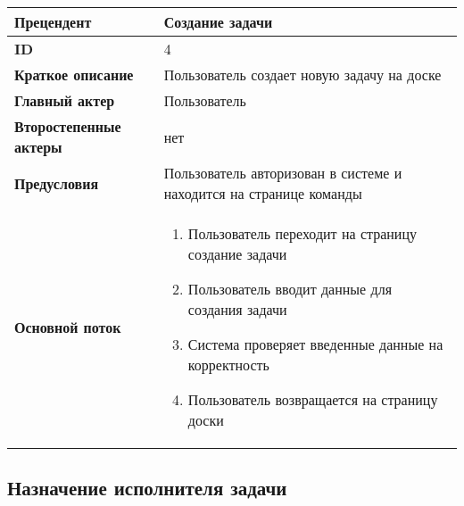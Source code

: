 \documentclass[14pt,a4paper]{extarticle}
\begin{document}
\begin{tabular}{|l|p{9cm}|}
	\hline
	\textbf{Прецендент}            & Создание задачи                                                    \\
	\hline
	\textbf{ID}                    & 4                                                                  \\
	\hline
	\textbf{Краткое описание}      & Пользователь создает новую задачу на доске                         \\
	\hline
	\textbf{Главный актер}         & Пользователь                                                       \\
	\hline
	\textbf{Второстепенные актеры} & нет                                                                \\
	\hline
	\textbf{Предусловия}           & Пользователь авторизован в системе и находится на странице команды \\
	\hline
	\textbf{Основной поток}        & \begin{enumerate}
		                                 \item Пользователь переходит на страницу создание задачи
		                                 \item Пользователь вводит данные для создания задачи
		                                 \item Система проверяет введенные данные на корректность
		                                 \item Пользователь возвращается на страницу доски
	                                 \end{enumerate}            \\
	\hline
\end{tabular}

\subsection{Назначение исполнителя задачи}
\end{document}
